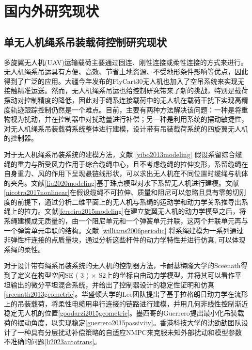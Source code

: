 \documentclass[lang=chs, degree=master, blindreview=false, winfonts=true]{yanputhesis}
\begin{document}
\section{国内外研究现状}
\subsection{单无人机绳系吊装载荷控制研究现状}
多旋翼无人机(UAV)运输载荷主要通过固连、刚性连接或柔性连接的方式来进行。无人机绳系吊运具有方便、高效、节省土地资源、不受地形条件影响等优点，因此得到了广泛的应用。大疆今年发布的FlyCart30无人机也加入了空吊系统来实现无接触精准运送。然而，无人机绳系吊运也给控制研究带来了新的挑战，特别是载荷摆动对控制精度的降低，因此对于绳系连接载荷中的无人机在载荷干扰下实现高精度轨迹跟踪控制仍然是一个难点。目前，主要有两种方法解决该问题：一种是将重物视为扰动，并在控制器中对扰动量进行补偿；另一种是利用系统的摆动敏捷性，对无人机绳系吊装载荷系统整体进行建模，设计带有吊装载荷系统的四旋翼无人机的控制器。

对于无人机绳系吊装系统的建模方法，文献 \ref{yibo2013modeling} 假设系留综合缆绳的重力与所受风力作用于综合缆绳中心，且不考虑缆绳的拉伸变形，系留缆绳在自身重力、风的作用下呈现悬链线形状，可以求出无人机在不同位置时缆绳与机体的夹角。文献\ref{liu2020modeling}基于珠点模型对水下系留无人机进行建模。文献\ref{nicotra2017nonlinear}在假设缆绳不可拉伸、质量和阻尼可以忽略且具有零剪切刚度的前提下，通过分析二维平面上的无人机与系绳的运动学和动力学关系推导出系绳上的拉力。文献\ref{ferreira2015modeling}在建立旋翼无人机的动力学模型之后，将系绳建模成无质量的，由一个阻尼单元和一个弹簧单元并联，这两个并联单元再与一个弹簧单元串联的结构。文献 \ref{williams2006periodic} 将系绳建模为一系列通过非弹性杆连接的点质量块，通过分析这些杆件的动力学特性并进行仿真, 可以体现系绳的柔性。

对于设计带有绳系吊装系统的无人机的控制器方法，卡耐基梅隆大学的Sceenath得到了定义在构型空间SE ( 3 ) × S2上的坐标自由动力学模型，并将其可以看作平坦输出的微分平坦混合系统，并给出了控制器设计的稳定性证明和仿真\ref{sreenath2013geometric}。华盛顿大学的Lee团队提出了基于拉格朗日动力学在流形上的吊装载荷，将柔性电缆用串行连接的链路进行建模，并用几何非线性控制渐近稳定无人机的位置\ref{goodarzi2015geometric}。墨西哥的Guerrero提出最小化吊装载荷的摆动角度，以实现稳定\ref{guerrero2015passivity}。香港科技大学的沈劭劼团队设计了一种具有分层扰动补偿策略的自适应NMPC来克服未知外部扰动和模型参数不准确的问题\ref{li2023autotrans}。
\end{document}
